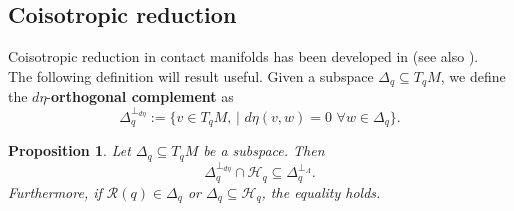 \documentclass[12pt]{article}
\newtheorem{prop}{Proposition}[section]
\begin{document}
\subsection{Coisotropic reduction}

Coisotropic reduction in contact manifolds has been developed in \cites{de2019contact} (see also \cites{Tortorella2017,le2019deformations}).\\


The following definition will result useful. Given a subspace $\Delta_q \subseteq T_qM$, we define the $d\eta$-\textbf{orthogonal complement} as $$\Delta_q^{\perp_{d\eta}}:= \{v \in T_qM,\,|\,\, d\eta(v,w) = 0\,\, \forall w \in \Delta_q\}.$$
\begin{prop} \label{ContactOrthogonalGeneral} Let $\Delta_q \subseteq T_qM$ be a subspace. Then $$\Delta_q^{\perp_{d\eta}} \cap \mathcal{H}_q \subseteq \Delta_q^{\perp_\Lambda}.$$ Furthermore, if $\mathcal{R}(q) \in \Delta_q$ or $\Delta_q \subseteq \mathcal{H}_q$, the equality holds.
\end{prop}
\end{document}
